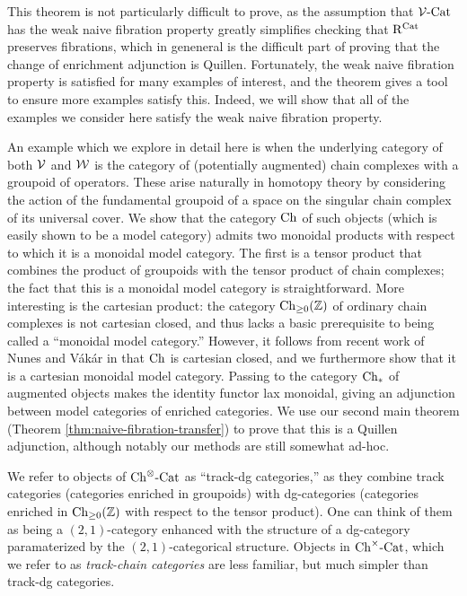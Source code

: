 \documentclass[12pt]{amsart}
\begin{document}
This theorem is not particularly difficult to prove, as the assumption that $\mathcal{V}\text{-}\mathrm{Cat}$ has the weak naive fibration property greatly simplifies checking that $\mathrm{R}^{\mathrm{Cat}}$ preserves fibrations, which in geneneral is the difficult part of proving that the change of enrichment adjunction is Quillen. 
Fortunately, the weak naive fibration property is satisfied for many examples of interest, and the theorem gives a tool to ensure more examples satisfy this.
Indeed, we will show that all of the examples we consider here satisfy the weak naive fibration property.  
\par 
An example which we explore in detail here is when the underlying category of both $\mathcal{V}$ and $\mathcal{W}$ is the category of 
(potentially augmented) chain complexes with a groupoid of operators. 
These arise naturally in homotopy theory by considering the action of the fundamental groupoid of a space on the singular chain complex of its universal cover.
We show that the category ${\mathrm{Ch}}$ of such objects (which is easily shown to be a model category) admits two monoidal products with respect to which it is a monoidal model category. 
The first is a tensor product that combines the product of groupoids with the tensor product of chain complexes; the fact that this is a monoidal model category is straightforward.
More interesting is the cartesian product: the category $\mathrm{Ch}_{\ge 0}(\mathbb{Z})$ of ordinary chain complexes is not cartesian closed, and thus lacks a basic prerequisite to being called a ``monoidal model category.'' 
However, it follows from recent work of Nunes and V{\'a}k{\'a}r in \cite{Nunes2024} that ${\mathrm{Ch}}$ is cartesian closed, and we furthermore show that it is a cartesian monoidal model category.
Passing to the category $\mathrm{Ch}_{*}$ of augmented objects makes the identity functor lax monoidal, giving an adjunction
\adjunctiondiagram{}{\trackdgcataug}{\trackchaincat}{}
between model categories of enriched categories. 
We use our second main theorem (Theorem \ref{thm:naive-fibration-transfer}) to prove that this is a Quillen adjunction, although notably our methods are still somewhat ad-hoc.
\par 
We refer to objects of ${{{\mathrm{Ch}}}^{\otimes}\text{-}\mathrm{Cat}}$ as ``track-dg categories,'' as they combine track categories (categories enriched in groupoids) with dg-categories (categories enriched in $\mathrm{Ch}_{\ge 0}(\mathbb{Z})$ with respect to the tensor product). 
One can think of them as being a $(2,1)$-category enhanced with the structure of a dg-category paramaterized by the $(2,1)$-categorical structure. 
Objects in ${{{\mathrm{Ch}}}^{\times}\text{-}\mathrm{Cat}}$, which we refer to as \textit{track-chain categories} are less familiar, but much simpler than track-dg categories. 
\end{document}

